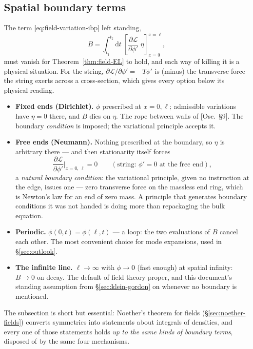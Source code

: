 \documentclass[11pt]{article}
\theoremstyle{plain}
\theoremstyle{definition}
\theoremstyle{remark}
\newcommand{\dd}{\mathrm{d}}
\newcommand{\pd}[2]{\frac{\partial #1}{\partial #2}}
\begin{document}
\subsection{Spatial boundary terms}
\label{sec:boundary-terms}

The term \eqref{eq:field-variation-ibp} left standing,
\begin{equation}
  B = \int_{t_1}^{t_2}\!\dd t\;
      \left[\pd{\mathcal L}{\phi'}\;\eta\right]_{x=0}^{x=\ell},
\end{equation}
must vanish for Theorem~\ref{thm:field-EL} to hold, and each way of
killing it is a physical situation. For the string,
$\partial\mathcal L/\partial\phi' = -T\phi'$ is (minus) the transverse
force the string exerts across a cross-section, which gives every
option below its physical reading.
\begin{itemize}
  \item \textbf{Fixed ends (Dirichlet).} $\phi$ prescribed at
  $x = 0, \ell$; admissible variations have $\eta = 0$ there, and $B$
  dies on $\eta$. The rope between walls of [Osc.\ \S9]. The boundary
  \emph{condition} is imposed; the variational principle accepts it.
  \item \textbf{Free ends (Neumann).} Nothing prescribed at the
  boundary, so $\eta$ is arbitrary there --- and then stationarity
  itself forces
  \begin{equation}
    \pd{\mathcal L}{\phi'}\bigg|_{x = 0,\,\ell} = 0
    \qquad(\text{string: } \phi' = 0 \text{ at the free end}),
  \end{equation}
  a \emph{natural boundary condition}: the variational principle,
  given no instruction at the edge, issues one --- zero transverse
  force on the massless end ring, which is Newton's law for an
  end of zero mass. A principle that generates boundary conditions it
  was not handed is doing more than repackaging the bulk equation.
  \item \textbf{Periodic.} $\phi(0, t) = \phi(\ell, t)$ --- a loop:
  the two evaluations of $B$ cancel each other. The
  most convenient choice for mode expansions, used in
  \S\ref{sec:outlook}.
  \item \textbf{The infinite line.} $\ell \to \infty$ with
  $\phi \to 0$ (fast enough) at spatial infinity: $B \to 0$ on decay.
  The default of field theory proper, and this document's standing
  assumption from \S\ref{sec:klein-gordon} on whenever no boundary is
  mentioned.
\end{itemize}
The subsection is short but essential: Noether's theorem for fields
(\S\ref{sec:noether-fields}) converts symmetries into statements about
integrals of densities, and every one of those statements holds
\emph{up to the same kinds of boundary terms}, disposed of by the same
four mechanisms.
\end{document}
